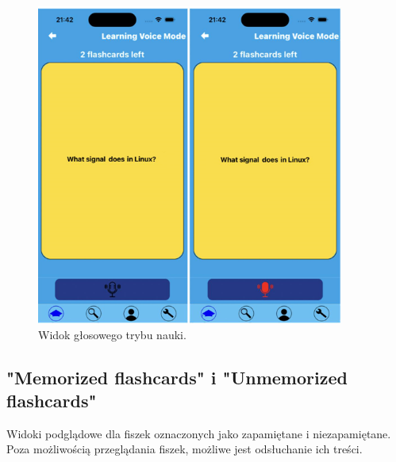 \begin{figure}[H]
    \centering
    \includegraphics[width=0.9\textwidth]{chapters/chapter_10/images_mobile/mobile_voice_control}
    \caption{Widok głosowego trybu nauki.}
    \label{img:mobile_voice_control}
\end{figure}

\subsection{"Memorized flashcards" i "Unmemorized flashcards"}
Widoki podglądowe dla fiszek oznaczonych jako zapamiętane i niezapamiętane. Poza możliwością przeglądania fiszek, możliwe jest odsłuchanie ich treści.

